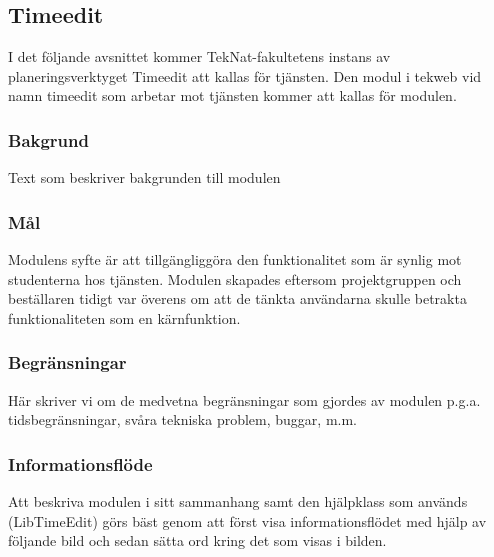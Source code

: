 \subsection{Timeedit}
I det följande avsnittet kommer TekNat-fakultetens instans av
planeringsverktyget Timeedit att kallas för tjänsten. Den modul i tekweb
vid namn timeedit som arbetar mot tjänsten kommer att kallas för
modulen.

\subsubsection{Bakgrund}
Text som beskriver bakgrunden till modulen

\subsubsection{Mål}
Modulens syfte är att tillgängliggöra den funktionalitet som är synlig
mot studenterna hos tjänsten. Modulen skapades eftersom projektgruppen
och beställaren tidigt var överens om att de tänkta användarna skulle
betrakta funktionaliteten som en kärnfunktion.

\subsubsection{Begränsningar}
Här skriver vi om de medvetna begränsningar som gjordes av modulen
p.g.a. tidsbegränsningar, svåra tekniska problem, buggar, m.m.

\subsubsection{Informationsflöde}
Att beskriva modulen i sitt sammanhang samt den hjälpklass som används
(LibTimeEdit) görs bäst genom att först visa informationsflödet med
hjälp av följande bild och sedan sätta ord kring det som visas i bilden.

